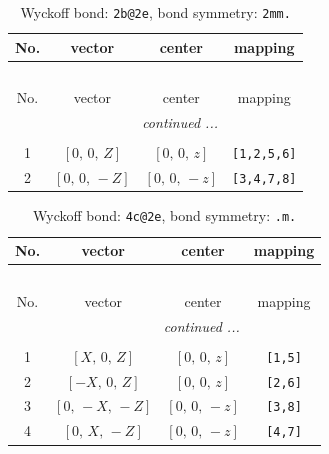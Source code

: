 \documentclass[fleqn,8pt]{jsarticle}
\begin{document}
\renewcommand{\arraystretch}{1.2}
\begin{longtable}{cccc}
\caption{Wyckoff bond: {\tt 2b@2e}, bond symmetry: {\tt 2mm.}}
 \\
 \hline \hline
No. & vector & center & mapping \\ \hline \endfirsthead

\multicolumn{3}{l}{\tablename\ \thetable{}} \\
 \hline \hline
No. & vector & center & mapping \\ \hline \endhead

 \hline \hline
\multicolumn{3}{r}{\footnotesize\it continued ...} \\ \endfoot

 \hline \hline
\multicolumn{3}{r}{} \\ \endlastfoot

1 & $\left[ 0,\, 0,\, Z \right]$ & $\left[ 0,\, 0,\, z \right]$ & {\tt [1,2,5,6]} \\ \hline
2 & $\left[ 0,\, 0,\, - Z \right]$ & $\left[ 0,\, 0,\, - z \right]$ & {\tt [3,4,7,8]} \\
\end{longtable}
\renewcommand{\arraystretch}{1.2}
\begin{longtable}{cccc}
\caption{Wyckoff bond: {\tt 4c@2e}, bond symmetry: {\tt .m.}}
 \\
 \hline \hline
No. & vector & center & mapping \\ \hline \endfirsthead

\multicolumn{3}{l}{\tablename\ \thetable{}} \\
 \hline \hline
No. & vector & center & mapping \\ \hline \endhead

 \hline \hline
\multicolumn{3}{r}{\footnotesize\it continued ...} \\ \endfoot

 \hline \hline
\multicolumn{3}{r}{} \\ \endlastfoot

1 & $\left[ X,\, 0,\, Z \right]$ & $\left[ 0,\, 0,\, z \right]$ & {\tt [1,5]} \\ \hline
2 & $\left[ - X,\, 0,\, Z \right]$ & $\left[ 0,\, 0,\, z \right]$ & {\tt [2,6]} \\ \hline
3 & $\left[ 0,\, - X,\, - Z \right]$ & $\left[ 0,\, 0,\, - z \right]$ & {\tt [3,8]} \\ \hline
4 & $\left[ 0,\, X,\, - Z \right]$ & $\left[ 0,\, 0,\, - z \right]$ & {\tt [4,7]} \\
\end{longtable}
\end{document}
